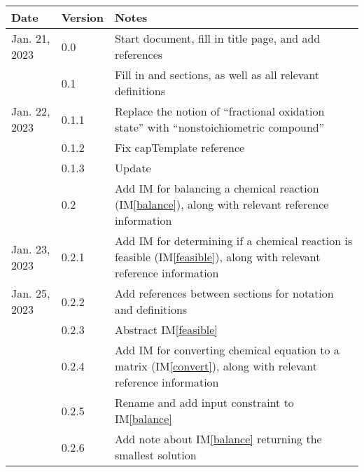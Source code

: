 \documentclass[12pt]{article}
\newcommand{\iref}[1]{IM\ref{#1}}
\begin{document}
\begin{tabularx}{\textwidth}{p{2.5cm}p{1.5cm}X}
  \toprule {\bf Date} & {\bf Version} & {\bf Notes}                                                         \\
  \midrule
  Jan. 21, 2023       & 0.0           & Start document, fill in title page, and add references              \\
                      & 0.1           & Fill in \nameref{sec_probDesc} and \nameref{sec_goals} sections, as
  well as all relevant definitions                                                                          \\
  Jan. 22, 2023       & 0.1.1         & Replace the notion of ``fractional oxidation state'' with
  ``nonstoichiometric compound''                                                                            \\
                      & 0.1.2         & Fix capTemplate reference                                           \\
                      & 0.1.3         & Update \nameref{sec_abbsAcrs}                                       \\
                      & 0.2           & Add IM for balancing a chemical reaction (\iref{balance}), along
  with relevant reference information                                                                       \\
  Jan. 23, 2023       & 0.2.1         & Add IM for determining if a chemical reaction is feasible
  (\iref{feasible}), along with relevant reference information                                              \\
  Jan. 25, 2023       & 0.2.2         & Add references between sections for notation and
  definitions                                                                                               \\
                      & 0.2.3         & Abstract \iref{feasible}                                            \\
                      & 0.2.4         & Add IM for converting chemical equation to a matrix
  (\iref{convert}), along with relevant reference information                                               \\
                      & 0.2.5         & Rename and add input constraint to \iref{balance}                   \\
                      & 0.2.6         & Add note about \iref{balance} returning the smallest solution       \\

\end{tabularx}
\end{document}

